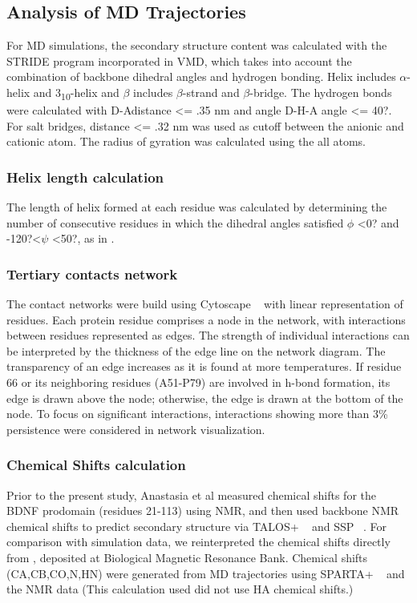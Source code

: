 \documentclass[journal=jacsat,manuscript=article]{achemso}
\begin{document}
\subsection*{Analysis of MD Trajectories} For MD simulations, the secondary structure content was  calculated with the STRIDE program incorporated in VMD,\cite{Humphrey1996}  which takes into account the combination of backbone dihedral angles and hydrogen bonding. Helix includes $\alpha$-helix and 3\textsubscript{10}-helix and $\beta$ includes $\beta$-strand and $\beta$-bridge. The hydrogen bonds were calculated with \textbar  D-A\textbar  distance \textless = .35 nm and angle D-H-A angle \textless= 40?. For salt bridges, distance \textless = .32 nm was used as cutoff between the anionic and cationic atom. The radius of gyration was calculated using the all atoms.

\subsubsection*{Helix length calculation} The length of helix formed at each residue was calculated by determining the number of consecutive residues in which the dihedral angles satisfied $\phi$ \textless 0? and -120?\textless $\psi$ \textless 50?, as in \cite{Nodet,Iglesias2013}.



\subsubsection*{Tertiary contacts network} The contact networks were build using Cytoscape ~\cite {Ahlstrom2013} with linear representation of residues.  Each protein residue comprises a node in the network, with interactions between residues represented as edges. The strength of individual interactions can be interpreted by the  thickness of the edge line on the network diagram. The transparency of an edge increases as it is found at more temperatures.  If residue  66 or its neighboring residues (A51-P79) are involved in h-bond formation, its edge is drawn above the node; otherwise, the edge is drawn at the bottom of the node. To focus on significant interactions, interactions showing more than 3\% persistence were considered in network visualization.      

\subsubsection*{Chemical Shifts calculation}  Prior to the present study, Anastasia et al\cite{Anastasia2013} measured chemical shifts for the BDNF prodomain (residues 21-113) using NMR, and then used backbone NMR chemical shifts to predict secondary structure via TALOS+ ~\cite{Shen2009} and SSP ~\cite{Marsh2006a}. For comparison with simulation data, we reinterpreted the chemical shifts directly from \cite{Anastasia2013}, deposited at Biological Magnetic Resonance Bank. Chemical shifts (CA,CB,CO,N,HN) were generated from MD trajectories using SPARTA+ ~\cite{Shen2010} and the NMR data (This calculation used did not use HA chemical shifts.)  
\end{document}
